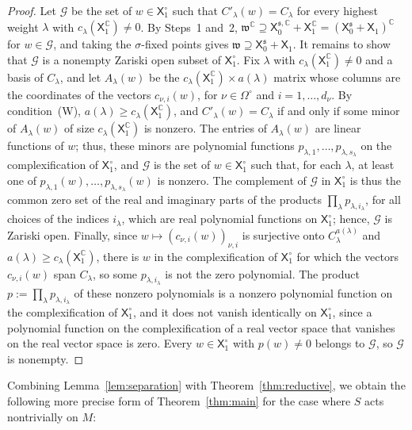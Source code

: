 \documentclass{article}
\newcommand{\C}{\mathbb{C}}
\newcommand{\fraks}{\mathfrak{s}}
\newcommand{\frakw}{\mathfrak{w}}
\newcommand{\sX}{\mathsf{X}}
\newcommand{\xc}[1]{\vspace{.1cm}
\noindent {\em #1} }
\theoremstyle{definition}
\theoremstyle{plain}
\begin{document}
\begin{proof}
\xc{Step~3: the Zariski open set.}
Let $\mathcal G$ be the set of $w\in\sX_1^\circ$ such that $C'_\lambda(w)=C_\lambda$ for every highest weight $\lambda$ with $c_\lambda(\sX_1^\C)\neq0$.
By Steps~1 and~2, $\frakw^\C\supseteq\sX_0^{\fraks,\C}+\sX_1^\C=(\sX_0^{\fraks}+\sX_1)^\C$ for $w\in\mathcal G$, and taking the $\sigma$-fixed points gives $\frakw\supseteq\sX_0^{\fraks}+\sX_1$.
It remains to show that $\mathcal G$ is a nonempty Zariski open subset of $\sX_1^\circ$.
Fix $\lambda$ with $c_\lambda(\sX_1^\C)\neq0$ and a basis of $C_\lambda$, and let $A_\lambda(w)$ be the $c_\lambda(\sX_1^\C)\times a(\lambda)$ matrix whose columns are the coordinates of the vectors $c_{\nu,i}(w)$, for $\nu\in\Omega^\circ$ and $i=1,\ldots,d_\nu$.
By condition~(W), $a(\lambda)\geq c_\lambda(\sX_1^\C)$, and $C'_\lambda(w)=C_\lambda$ if and only if some minor of $A_\lambda(w)$ of size $c_\lambda(\sX_1^\C)$ is nonzero.
The entries of $A_\lambda(w)$ are linear functions of $w$; thus, these minors are polynomial functions $p_{\lambda,1},\ldots,p_{\lambda,s_\lambda}$ on the complexification of $\sX_1^\circ$, and $\mathcal G$ is the set of $w\in\sX_1^\circ$ such that, for each $\lambda$, at least one of $p_{\lambda,1}(w),\ldots,p_{\lambda,s_\lambda}(w)$ is nonzero.
The complement of $\mathcal G$ in $\sX_1^\circ$ is thus the common zero set of the real and imaginary parts of the products $\prod_\lambda p_{\lambda,i_\lambda}$, for all choices of the indices $i_\lambda$, which are real polynomial functions on $\sX_1^\circ$; hence, $\mathcal G$ is Zariski open.
Finally, since $w\mapsto(c_{\nu,i}(w))_{\nu,i}$ is surjective onto $C_\lambda^{a(\lambda)}$ and $a(\lambda)\geq c_\lambda(\sX_1^\C)$, there is $w$ in the complexification of $\sX_1^\circ$ for which the vectors $c_{\nu,i}(w)$ span $C_\lambda$, so some $p_{\lambda,i_\lambda}$ is not the zero polynomial.
The product $p:=\prod_\lambda p_{\lambda,i_\lambda}$ of these nonzero polynomials is a nonzero polynomial function on the complexification of $\sX_1^\circ$, and it does not vanish identically on $\sX_1^\circ$, since a polynomial function on the complexification of a real vector space that vanishes on the real vector space is zero.
Every $w\in\sX_1^\circ$ with $p(w)\neq0$ belongs to $\mathcal G$, so $\mathcal G$ is nonempty.
\end{proof}


Combining Lemma~\ref{lem:separation} with Theorem~\ref{thm:reductive}, we obtain the following more precise form of Theorem~\ref{thm:main} for the case where $S$ acts nontrivially on $M$:
\end{document}
